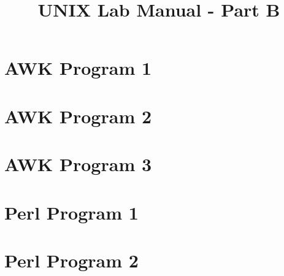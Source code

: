 \documentclass[12pt]{article}
\title{UNIX Lab Manual - Part B}
\author{}
\date{}
\begin{document}
\maketitle

\section{AWK Program 1}


\section{AWK Program 2}


\section{AWK Program 3}


\section{Perl Program 1}


\section{Perl Program 2}

\end{document}
